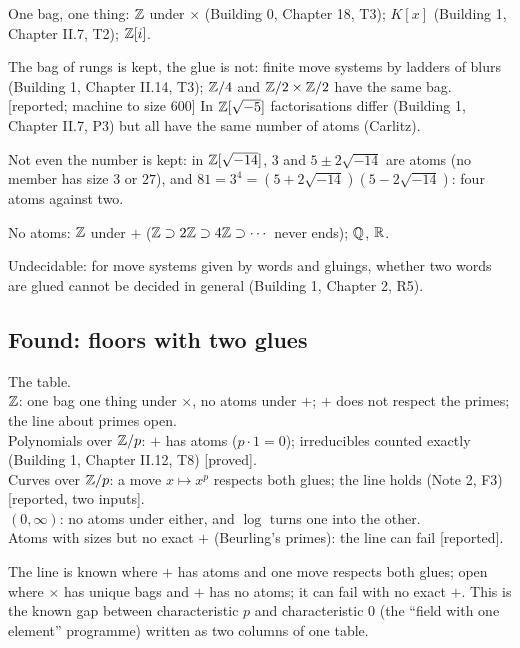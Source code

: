 \begin{lines}
\item[\lab{F1}] [proved] One bag, one thing: $\mathbb{Z}$ under $\times$ (Building 0, Chapter 18, T3); $K[x]$ (Building 1, Chapter II.7, T2); $\mathbb{Z}[i]$.
\item[\lab{F2}] [proved] The bag of rungs is kept, the glue is not: finite move systems by ladders of blurs (Building 1, Chapter II.14, T3); $\mathbb{Z}/4$ and $\mathbb{Z}/2 \times \mathbb{Z}/2$ have the same bag. [reported; machine to size $600$] In $\mathbb{Z}[\sqrt{-5}]$ factorisations differ (Building 1, Chapter II.7, P3) but all have the same number of atoms (Carlitz).
\item[\lab{F3}] [proved] Not even the number is kept: in $\mathbb{Z}[\sqrt{-14}]$, $3$ and $5 \pm 2\sqrt{-14}$ are atoms (no member has size $3$ or $27$), and $81 = 3^4 = (5 + 2\sqrt{-14})(5 - 2\sqrt{-14})$: four atoms against two.
\item[\lab{F4}] [proved] No atoms: $\mathbb{Z}$ under $+$ ($\mathbb{Z} \supset 2\mathbb{Z} \supset 4\mathbb{Z} \supset \cdots$ never ends); $\mathbb{Q}$, $\mathbb{R}$.
\item[\lab{F5}] [reported] Undecidable: for move systems given by words and gluings, whether two words are glued cannot be decided in general (Building 1, Chapter 2, R5).
\end{lines}

\subsection*{Found: floors with two glues}

\begin{lines}
\item[\lab{F6}] The table. \\
$\mathbb{Z}$: one bag one thing under $\times$, no atoms under $+$; $+$ does not respect the primes; the line about primes open. \\
Polynomials over $\mathbb{Z}/p$: $+$ has atoms ($p \cdot 1 = 0$); irreducibles counted exactly (Building 1, Chapter II.12, T8) [proved]. \\
Curves over $\mathbb{Z}/p$: a move $x \mapsto x^p$ respects both glues; the line holds (Note 2, F3) [reported, two inputs]. \\
$(0, \infty)$: no atoms under either, and $\log$ turns one into the other. \\
Atoms with sizes but no exact $+$ (Beurling's primes): the line can fail [reported].
\item[\lab{F7}] [unchecked; an observation] The line is known where $+$ has atoms and one move respects both glues; open where $\times$ has unique bags and $+$ has no atoms; it can fail with no exact $+$. This is the known gap between characteristic $p$ and characteristic $0$ (the ``field with one element'' programme) written as two columns of one table.
\end{lines}

